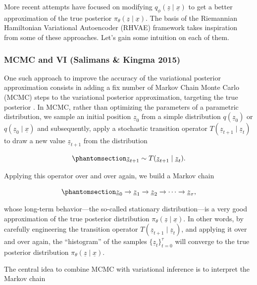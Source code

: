 \documentclass[
]{scrartcl}
\begin{document}
\begin{refsection}
More recent attempts have focused on modifying
\(q_\phi(\underline{z} \mid
\underline{x})\) to get a better approximation of the true posterior
\(π_\theta(\underline{z} \mid \underline{x})\). The basis of the
Riemannian Hamiltonian Variational Autoencoder (RHVAE) framework takes
inspiration from some of these approaches. Let's gain some intuition on
each of them.

\subsubsection{MCMC and VI (Salimans \& Kingma
2015)}\label{mcmc-and-vi-salimans-kingma-2015}

One such approach to improve the accuracy of the variational posterior
approximation consists in adding a fix number of Markov Chain Monte
Carlo (MCMC) steps to the variational posterior approximation, targeting
the true posterior \autocite{salimans2015}. In MCMC, rather than
optimizing the parameters of a parametric distribution, we sample an
initial position \(\underline{z}_0\) from a simple distribution
\(q(\underline{z}_0)\) or \(q(\underline{z}_0 \mid \underline{x})\) and
subsequently, apply a stochastic transition operator
\(T(\underline{z}_{t+1} \mid
\underline{z}_t)\) to draw a new value \(\underline{z}_{t+1}\) from the
distribution

\begin{equation}\phantomsection\label{eq-mcmc-transition}{
\underline{z}_{t + 1} \sim T(\underline{z}_{t+1} \mid \underline{z}_t).
}\end{equation}

Applying this operator over and over again, we build a Markov chain

\begin{equation}\phantomsection\label{eq-mcmc-chain}{
\underline{z}_0 \to \underline{z}_1 \to \underline{z}_2 \to \cdots 
\to \underline{z}_\tau,
}\end{equation}

whose long-term behavior---the so-called stationary distribution---is a
very good approximation of the true posterior distribution
\(π_\theta(\underline{z}
\mid \underline{x})\). In other words, by carefully engineering the
transition operator \(T(\underline{z}_{t+1} \mid \underline{z}_t)\), and
applying it over and over again, the ``histogram'' of the samples
\(\{\underline{z}_t\}_{t=0}^\tau\) will converge to the true posterior
distribution \(π_\theta(\underline{z} \mid
\underline{x})\).

The central idea to combine MCMC with variational inference is to
interpret the Markov chain


\end{refsection}
\end{document}
